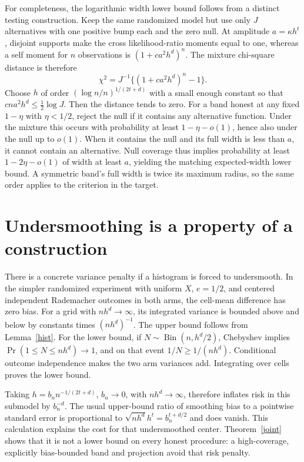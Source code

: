 \documentclass[11pt]{article}
\theoremstyle{remark}
\begin{document}
For completeness, the logarithmic width lower bound follows from a distinct testing construction. Keep the same randomized model but use only $J$ alternatives with one positive bump each and the zero null. At amplitude $a=\kappa h^t$, disjoint supports make the cross likelihood-ratio moments equal to one, whereas a self moment for $n$ observations is $(1+c a^2h^d)^n$. The mixture chi-square distance is therefore
\[
 \chi^2=J^{-1}\{(1+c a^2h^d)^n-1\}.
\]
Choose $h$ of order $(\log n/n)^{1/(2t+d)}$ with a small enough constant so that $cna^2h^d\leq\frac12\log J$. Then the distance tends to zero. For a band honest at any fixed $1-\eta$ with $\eta<1/2$, reject the null if it contains any alternative function. Under the mixture this occurs with probability at least $1-\eta-o(1)$, hence also under the null up to $o(1)$. When it contains the null and its full width is less than $a$, it cannot contain an alternative. Null coverage thus implies probability at least $1-2\eta-o(1)$ of width at least $a$, yielding the matching expected-width lower bound. A symmetric band's full width is twice its maximum radius, so the same order applies to the criterion in the target.

\section{Undersmoothing is a property of a construction}
There is a concrete variance penalty if a histogram is forced to undersmooth. In the simpler randomized experiment with uniform $X$, $e=1/2$, and centered independent Rademacher outcomes in both arms, the cell-mean difference has zero bias. For a grid with $nh^d\to\infty$, its integrated variance is bounded above and below by constants times $(nh^d)^{-1}$. The upper bound follows from Lemma~\ref{hist}. For the lower bound, if $N\sim\operatorname{Bin}(n,h^d/2)$, Chebyshev implies $\Pr(1\leq N\leq nh^d)\to1$, and on that event $1/N\geq1/(nh^d)$. Conditional outcome independence makes the two arm variances add. Integrating over cells proves the lower bound.

Taking $h=b_n n^{-1/(2t+d)}$, $b_n\to0$, with $nh^d\to\infty$, therefore inflates risk in this submodel by $b_n^{-d}$. The usual upper-bound ratio of smoothing bias to a pointwise standard error is proportional to
$\sqrt{nh^d}h^t=b_n^{t+d/2}$ and does vanish. This calculation explains the cost for that undersmoothed center. Theorem~\ref{joint} shows that it is not a lower bound on every honest procedure: a high-coverage, explicitly bias-bounded band and projection avoid that risk penalty.
\end{document}

